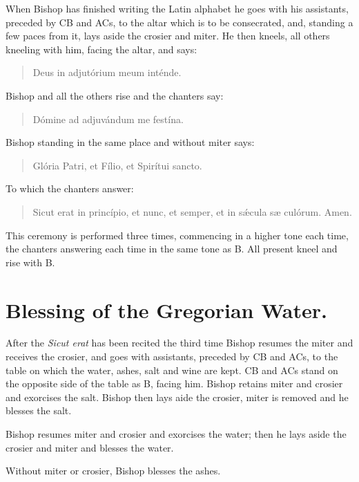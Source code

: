 \documentclass[letterpaper]{report}
\begin{document}
{\rubric When Bishop has finished writing the Latin alphabet he goes with his
assistants, preceded by CB and ACs, to the altar which is to be consecrated,
and, standing a few paces from it, lays aside the crosier and miter. He then
kneels, all others kneeling with him, facing the altar, and says:

\begin{quote}
    \vbar Deus in adjutórium meum inténde.
\end{quote}

Bishop and all the others rise and the chanters say:

\begin{quote}
    \rbar Dómine ad adjuvándum me festína.
\end{quote}

Bishop standing in the same place and without miter says:

\begin{quote}
    \vbar Glória Patri, et Fílio, et Spirítui sancto.
\end{quote}

To which the chanters answer:

\begin{quote}
    \rbar Sicut erat in princípio, et nunc, et semper, et in s\'\ae cula s\ae
    culórum. Amen.
\end{quote}

This ceremony is performed three times, commencing in a higher tone each time,
the chanters answering each time in the same tone as B. All present kneel and
rise with B. 

\section{Blessing of the Gregorian Water.}

\rubric After the \textit{Sicut erat} has been recited the third time Bishop resumes the
miter and receives the crosier, and goes with assistants, preceded by CB and
ACs, to the table on which the water, ashes, salt and wine are kept. CB and ACs
stand on the opposite side of the table as B, facing him. Bishop retains miter and
crosier and exorcises the salt. Bishop then lays aide the crosier, miter is removed
and he blesses the salt.

\rubric Bishop resumes miter and crosier and exorcises the water; then he lays aside
the crosier and miter and blesses the water. 

\rubric Without miter or crosier, Bishop blesses the ashes.

}
\end{document}
